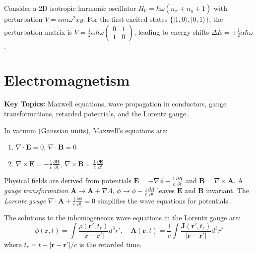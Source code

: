 \begin{example}
Consider a 2D isotropic harmonic oscillator $H_0 = \hbar\omega(n_x + n_y + 1)$ with perturbation $V = \alpha m \omega^2 x y$. For the first excited states $\{|1,0\rangle, |0,1\rangle\}$, the perturbation matrix is $V = \frac{1}{2}\alpha \hbar \omega \begin{pmatrix} 0 & 1 \\ 1 & 0 \end{pmatrix}$, leading to energy shifts $\Delta E = \pm \frac{1}{2}\alpha \hbar \omega$.
\end{example}

\section{Electromagnetism}

\textbf{Key Topics:} Maxwell equations, wave propagation in conductors, gauge transformations, retarded potentials, and the Lorentz gauge.

\begin{definition}
In vacuum (Gaussian units), Maxwell's equations are:
\begin{enumerate}
    \item $\nabla \cdot \mathbf{E} = 0$, $\nabla \cdot \mathbf{B} = 0$
    \item $\nabla \times \mathbf{E} = -\frac{1}{c}\frac{\partial \mathbf{B}}{\partial t}$, $\nabla \times \mathbf{B} = \frac{1}{c}\frac{\partial \mathbf{E}}{\partial t}$
\end{enumerate}
\end{definition}

\begin{definition}
Physical fields are derived from potentials $\mathbf{E} = -\nabla \phi - \frac{1}{c} \frac{\partial \mathbf{A}}{\partial t}$ and $\mathbf{B} = \nabla \times \mathbf{A}$. A \emph{gauge transformation} $\mathbf{A} \to \mathbf{A} + \nabla \Lambda$, $\phi \to \phi - \frac{1}{c} \frac{\partial \Lambda}{\partial t}$ leaves $\mathbf{E}$ and $\mathbf{B}$ invariant. The \emph{Lorentz gauge} $\nabla \cdot \mathbf{A} + \frac{1}{c} \frac{\partial \phi}{\partial t} = 0$ simplifies the wave equations for potentials.
\end{definition}

\begin{theorem}
The solutions to the inhomogeneous wave equations in the Lorentz gauge are:
\[ \phi(\mathbf{r}, t) = \int \frac{\rho(\mathbf{r}', t_r)}{|\mathbf{r} - \mathbf{r}'|} d^3 r', \quad \mathbf{A}(\mathbf{r}, t) = \frac{1}{c} \int \frac{\mathbf{J}(\mathbf{r}', t_r)}{|\mathbf{r} - \mathbf{r}'|} d^3 r' \]
where $t_r = t - |\mathbf{r} - \mathbf{r}'|/c$ is the retarded time.
\end{theorem}

